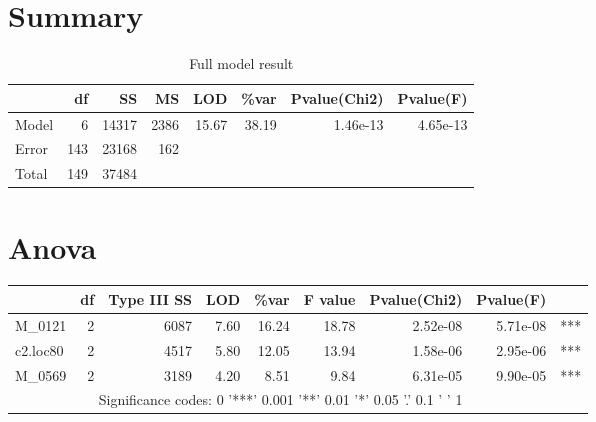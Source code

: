 \documentclass[a4paper,11pt]{article}\usepackage[]{graphicx}\usepackage[]{color}
\begin{document}
\clearpage
\section{Summary}
\begin{table}[ht]
\begin{flushleft}
\caption{Full model result} 
\label{modRes}
\begin{tabular}{lrrrrrrr}
  \hline
 & df & SS & MS & LOD & \%var & Pvalue(Chi2) & Pvalue(F) \\ 
  \hline
Model & 6 & 14317 & 2386 & 15.67 & 38.19 & 1.46e-13 & 4.65e-13 \\ 
  Error & 143 & 23168 & 162 &  &  &  &  \\ 
  Total & 149 & 37484 &  &  &  &  &  \\ 
   \hline
\end{tabular}
\end{flushleft}
\end{table}

\section{Anova}%
\begin{table}[ht]
\begin{flushleft}
\begin{tabular}{lrrrrrrrl}
  \hline
 & df & Type III SS & LOD & \%var & F value & Pvalue(Chi2) & Pvalue(F) &  \\ 
  \hline
M\_0121 & 2 & 6087 & 7.60 & 16.24 & 18.78 & 2.52e-08 & 5.71e-08 & *** \\ 
  c2.loc80 & 2 & 4517 & 5.80 & 12.05 & 13.94 & 1.58e-06 & 2.95e-06 & *** \\ 
  M\_0569 & 2 & 3189 & 4.20 & 8.51 & 9.84 & 6.31e-05 & 9.90e-05 & *** \\ 
   \hline  \multicolumn{8}{c}{Significance codes:  0 '***' 0.001 '**' 0.01 '*' 0.05 '.' 0.1 ' ' 1} \\ \hline
\end{tabular}
\label{anova}
\end{flushleft}
\end{table}
\clearpage
\end{document}
